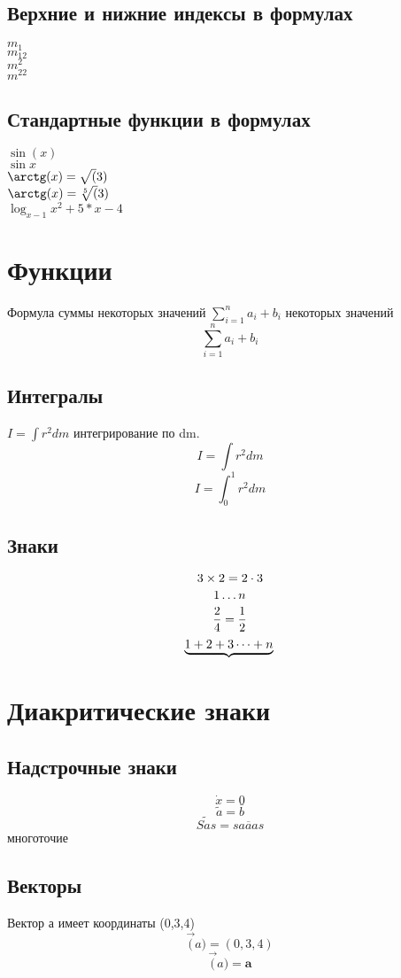 \documentclass[a4paper,14pt]{article} %
\begin{document}
\subsection{Верхние и нижние индексы в формулах}
$m_1$\\
$m_{12}$\\
$m^2$\\
$m^{22}$\\

\subsection{Стандартные функции в формулах}
$\sin(x)$\\
$\sin x$\\
$\arctg(x) = \sqrt(3)$\\
$\arctg(x) = \sqrt[5](3)$\\
$\log_{x-1}{x^2+5*x-4}$

\section{Функции}
Формула суммы некоторых значений $\sum_{i=1}^{n}a_i+b_i$ некоторых значений\\
\[ \sum_{i=1}^{n}a_i+b_i \]
\subsection{Интегралы}
$I=\int r^2dm$ интегрирование по dm.\\
$$I=\int r^2dm$$
$$I=\int_{0}^{1} r^2dm$$
\subsection{Знаки}
$$3\times2=2\cdot 3\\$$
$$1\dots n\\$$
$$\frac{2}{4} = \frac{1}{2}\\$$
$$\underbrace{1+2+3\dots+n}\\$$
\section{Диакритические знаки}
\subsection{Надстрочные знаки}
\[\dot{x}=0\]
\[\tilde{a}=\bar{b}\]
\[\widetilde{Sas}=\overline{saaas}\]
многоточие \cdots
\subsection{Векторы}
Вектор а имеет координаты (0,3,4)
\[\overrightarrow(a) = (0,3,4)\]
\[\overrightarrow(a) = \mathbf{a}\]
\end{document}
